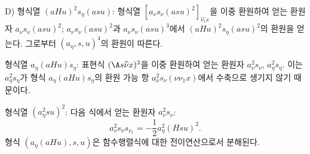 
D) 형식열 $(aHu)^2s_\eta(asu)$: 형식열 $[a_\nu s_\nu(asu)^2]_{\widehat{\nu_1}x}$을 이중 환원하여 얻는 환원자 $a_\nu s_\nu(asu)^2$; $a_\nu s_\nu(asu)^2$과 $a_\nu s_\nu(asu)^3$에서 $(aHu)^2s_\eta(asu)^2$의 환원을 얻는다. 그로부터 $(a_\eta,s,u)^4$의 환원이 따른다.

형식열 $a_\eta(aHu)s_\eta$: 표현식 $(\A s\widehat{\nu}x)^3$을 이중 환원하여 얻는 환원자 $a_\nu^2s_\nu$, $a_\eta^2s_\eta$. 이는 $a_\eta^2s_\eta$가 형식 $a_\eta(aHu)s_\eta$의 환원 가능 항 $a_\nu^2s_\nu(\nu\nu_1x)$에서 수축으로 생기지 않기 때문이다.

형식열 $(a_\eta^2su)^2$: 다음 식에서 얻는 환원자 $a_\nu^2s_\nu$:
\[
a_\nu^2s_\nu s_{\nu_1}=-\frac12a_\eta^2(Hsu)^2.
\]
형식 $(a_\eta(aHu),s,u)$은 함수행렬식에 대한 전이연산으로서 분해된다.
